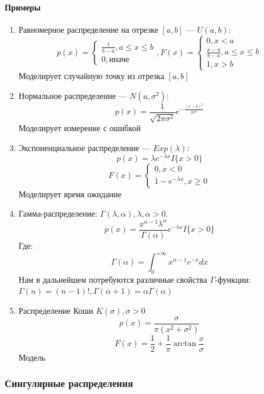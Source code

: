 \paragraph{Примеры}
\begin{enumerate}
    \item Равномерное распределение на отрезке \([a, b]\) --- \(U(a, b)\): 
    \[p(x) = \left\{\begin{array}{l}
        \frac{1}{b - a}, a \le x \le b \\
        0, \text{иначе}
    \end{array}\right., F(x) = \left\{\begin{array}{l}
        0, x < a \\
        \frac{x - a}{b - a}, a \le x \le b \\
        1, x > b
    \end{array}\right.\]
    Моделирует случайную точку из отрезка \([a, b]\)
    \item Нормальное распределение --- \(N(a, \sigma^2)\):
    \[p(x) = \frac{1}{\sqrt{2\pi \sigma^2}}e^{-\frac{(x - a)^2}{2\sigma^2}}\]
    Моделирует измерение с ошибкой

    \item Экспоненциальное распределение --- \(Exp(\lambda)\):
    \[p(x) = \lambda e^{-\lambda x} I\{x > 0\}\]
    \[F(x) = \left\{\begin{array}{l}
        0, x < 0 \\
        1 - e^{-\lambda x}, x \ge 0
    \end{array}\right.\]
    Моделирует время ожидание

    \item Гамма-распределение: \(\Gamma(\lambda, \alpha), \lambda, \alpha > 0\).
    \[p(x) = \frac{x^{\alpha - 1}\lambda^\alpha}{\Gamma(\alpha)}e^{-\lambda x}I\{x > 0\}\]
    Где:
    \[\Gamma(\alpha) = \int_0^{+\infty} x^{\alpha - 1}e^{-x}dx\]
    Нам в дальнейшем потребуются различные свойства \(\Gamma\)-функции: \(\Gamma(n) = (n - 1)!, \Gamma(\alpha + 1) = \alpha\Gamma(\alpha)\)

    \item Распределение Коши \(K(\sigma), \sigma > 0\)
    \[p(x) = \frac{\sigma}{\pi(x^2 + \sigma^2)}\]
    \[F(x) = \frac{1}{2} + \frac{1}{\pi}\arctan \frac{x}{\sigma}\]
    Модель
\end{enumerate}


\subsubsection{Сингулярные распределения}

